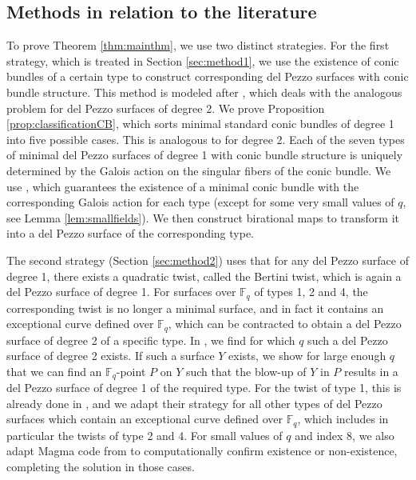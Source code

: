 \documentclass[a4paper, 11pt, reqno]{amsart}
\numberwithin{equation}{section} \numberwithin{figure}{section}
\def \F {{\mathbb F}}
\theoremstyle{definition}
\numberwithin{lemma}{section}
\begin{document}
\subsection{Methods in relation to the literature}

To prove Theorem \ref{thm:mainthm}, we use two distinct strategies. For the first strategy, which is treated in Section \ref{sec:method1}, we use the existence of conic bundles of a certain type to construct corresponding del Pezzo surfaces with conic bundle structure. This method is modeled after \cite{trepalindeg2}, which deals with the analogous problem for del Pezzo surfaces of degree 2. We prove Proposition \ref{prop:classificationCB}, which sorts minimal standard conic bundles of degree 1 into five possible cases. This is analogous to \cite[Proposition 2.3]{trepalindeg2} for degree 2. Each of the seven types of minimal del Pezzo surfaces of degree 1 with conic bundle structure is uniquely determined by the Galois action on the singular fibers of the conic bundle. We use \cite[Theorem 2.11]{rybakov}, which guarantees the existence of a minimal conic bundle with the corresponding Galois action for each type (except for some very small values of $q$, see Lemma \ref{lem:smallfields}). We then construct birational maps to transform it into a del Pezzo surface of the corresponding type.

The second strategy (Section \ref{sec:method2}) uses that for any del Pezzo surface of degree 1, there exists a quadratic twist, called the Bertini twist, which is again a del Pezzo surface of degree 1. For surfaces over $\F_q$ of types 1, 2 and 4, the corresponding twist is no longer a minimal surface, and in fact it contains an exceptional curve defined over $\F_q$, which can be contracted to obtain a del Pezzo surface of degree 2 of a specific type. In \cite[Theorem 1.2]{LoughranTrepalin}, we find for which $q$ such a del Pezzo surface of degree 2 exists. If such a surface $Y$ exists, we show for large enough $q$ that we can find an $\F_q$-point $P$ on $Y$ such that the blow-up of $Y$ in $P$ results in a del Pezzo surface of degree 1 of the required type. For the twist of type 1, this is already done in \cite{BFL}, and we adapt their strategy for all other types of del Pezzo surfaces which contain an exceptional curve defined over $\F_q$, which includes in particular the twists of type 2 and 4. For small values of $q$ and index 8, we also adapt Magma code from \cite{BFL} to computationally confirm existence or non-existence, completing the solution in those cases. 
\end{document}
